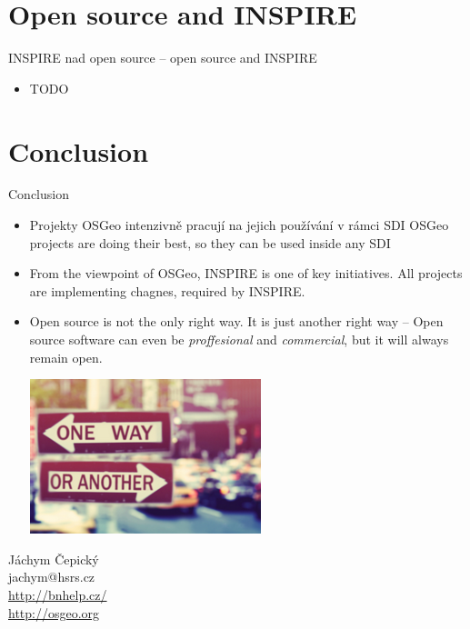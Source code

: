 \documentclass[xcolor=dvipsnames]{beamer}
\begin{document}
\section{Open source and INSPIRE}
\begin{frame}{INSPIRE nad open source -- open source and INSPIRE}
    \begin{itemize}
        \item TODO
    \end{itemize}
\end{frame}



\section*{Conclusion}

\begin{frame}{Conclusion}

  \begin{itemize}
  \item
    Projekty OSGeo intenzivně pracují na jejich používání v rámci SDI
    OSGeo projects are doing their best, so they can be used inside any SDI
  \item
    From the viewpoint of OSGeo, INSPIRE is one of key initiatives. All projects
    are implementing chagnes, required by INSPIRE.
  \item 
      Open source is not the only right way. It is just another right way --
      Open source software can even be {\em proffesional} and {\em commercial},
      but it will always remain \alert{open}.

\begin{center} 
    \includegraphics[height=4.5cm]{imgs/ils/oneway.png}
\end{center}
  
\end{itemize}
  
\end{frame}


\begin{frame}
    \begin{center}
        Jáchym Čepický \\
        jachym@hsrs.cz \\
        \url{http://bnhelp.cz/} \\
        \url{http://osgeo.org}
    \end{center}
\end{frame}
\end{document}
